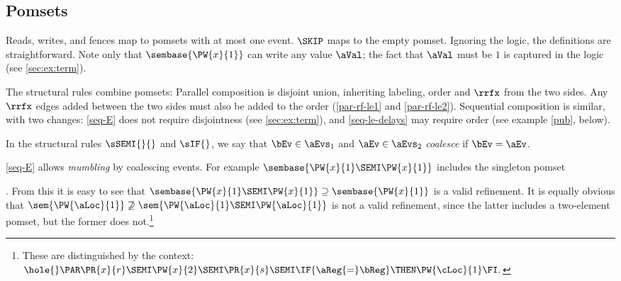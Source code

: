 \subsection{Pomsets}
\label{sec:ex:pomset}


Reads, writes, and fences map to pomsets with at most one event.  $\SKIP$
maps to the empty pomset.  Ignoring the logic, the definitions are
straightforward.  Note only that $\sembase{\PW{x}{1}}$ can write any value
$\aVal$; the fact that $\aVal$ must be $1$ is captured in the logic (see
\textsection\ref{sec:ex:term}).

The structural rules combine pomsets:  Parallel composition is disjoint
union, inheriting labeling, order and $\rrfx$ from the two sides.  Any
$\rrfx$ edges added between the two sides must also be added to the order
(\ref{par-rf-le1} and \ref{par-rf-le2}).
% 
Sequential composition is similar, with two changes: \ref{seq-E} does not
require disjointness (see \textsection\ref{sec:ex:term}), and
\ref{seq-le-delays} may require order (see example \ref{pub}, below).


In the structural rules $\sSEMI{}{}$ and $\sIF{}$, we say that
$\bEv\in\aEvs_1$ and $\aEv\in\aEvs_2$ \emph{coalesce} if $\bEv=\aEv$.

\ref{seq-E} allows \emph{mumbling} \cite{DBLP:journals/iandc/Brookes96} by
coalescing events.  For example
\begin{math}
  \sembase{\PW{x}{1} \SEMI \PW{x}{1}}
\end{math}
includes the singleton pomset
\begin{tikzinlinesmall}[node distance=.5em and 1.5em]
\end{tikzinlinesmall}.  From this it is easy to see that
\begin{math}
  \sembase{\PW{x}{1}\SEMI\PW{x}{1}}
  \supseteq
  \sembase{\PW{x}{1}}
\end{math}
is a valid refinement.  It is equally obvious that
\begin{math}
  \sem{\PW{\aLoc}{1}} 
  \not\supseteq
  \sem{\PW{\aLoc}{1} \SEMI \PW{\aLoc}{1}}
\end{math}
is not a valid refinement, since the latter includes a two-element pomset,
but the former does not.\footnote{These are distinguished by the context:
  \begin{math}
    \hole{} \PAR
    \PR{x}{r} \SEMI
    \PW{x}{2} \SEMI
    \PR{x}{s}\SEMI
    \IF{\aReg {=} \bReg} \THEN \PW{\cLoc}{1} \FI.
  \end{math}}


